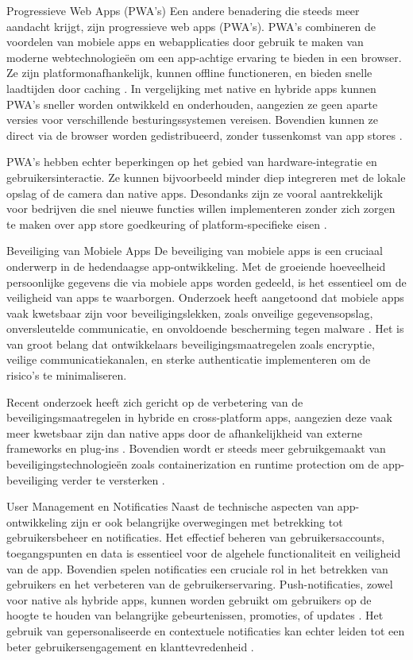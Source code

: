 Progressieve Web Apps (PWA’s)
Een andere benadering die steeds meer aandacht krijgt, zijn progressieve web apps (PWA's). PWA's combineren de voordelen van mobiele apps en webapplicaties door gebruik te maken van moderne webtechnologieën om een app-achtige ervaring te bieden in een browser. Ze zijn platformonafhankelijk, kunnen offline functioneren, en bieden snelle laadtijden door caching \autocite{DavidFortunato2018}. In vergelijking met native en hybride apps kunnen PWA's sneller worden ontwikkeld en onderhouden, aangezien ze geen aparte versies voor verschillende besturingssystemen vereisen. Bovendien kunnen ze direct via de browser worden gedistribueerd, zonder tussenkomst van app stores \autocite{AndreasBioernHansen2018}.

PWA’s hebben echter beperkingen op het gebied van hardware-integratie en gebruikersinteractie. Ze kunnen bijvoorbeeld minder diep integreren met de lokale opslag of de camera dan native apps. Desondanks zijn ze vooral aantrekkelijk voor bedrijven die snel nieuwe functies willen implementeren zonder zich zorgen te maken over app store goedkeuring of platform-specifieke eisen \autocite{Mozilla}.

Beveiliging van Mobiele Apps
De beveiliging van mobiele apps is een cruciaal onderwerp in de hedendaagse app-ontwikkeling. Met de groeiende hoeveelheid persoonlijke gegevens die via mobiele apps worden gedeeld, is het essentieel om de veiligheid van apps te waarborgen. Onderzoek heeft aangetoond dat mobiele apps vaak kwetsbaar zijn voor beveiligingslekken, zoals onveilige gegevensopslag, onversleutelde communicatie, en onvoldoende bescherming tegen malware \autocite{Zhu2014}. Het is van groot belang dat ontwikkelaars beveiligingsmaatregelen zoals encryptie, veilige communicatiekanalen, en sterke authenticatie implementeren om de risico’s te minimaliseren.

Recent onderzoek heeft zich gericht op de verbetering van de beveiligingsmaatregelen in hybride en cross-platform apps, aangezien deze vaak meer kwetsbaar zijn dan native apps door de afhankelijkheid van externe frameworks en plug-ins \autocite{YongWang2015}. Bovendien wordt er steeds meer gebruikgemaakt van beveiligingstechnologieën zoals containerization en runtime protection om de app-beveiliging verder te versterken \autocite{PawelWeichbroth2020}.

User Management en Notificaties
Naast de technische aspecten van app-ontwikkeling zijn er ook belangrijke overwegingen met betrekking tot gebruikersbeheer en notificaties. Het effectief beheren van gebruikersaccounts, toegangspunten en data is essentieel voor de algehele functionaliteit en veiligheid van de app. Bovendien spelen notificaties een cruciale rol in het betrekken van gebruikers en het verbeteren van de gebruikerservaring. Push-notificaties, zowel voor native als hybride apps, kunnen worden gebruikt om gebruikers op de hoogte te houden van belangrijke gebeurtenissen, promoties, of updates \autocite{Android2024}. Het gebruik van gepersonaliseerde en contextuele notificaties kan echter leiden tot een beter gebruikersengagement en klanttevredenheid \autocite{Sarin}.

